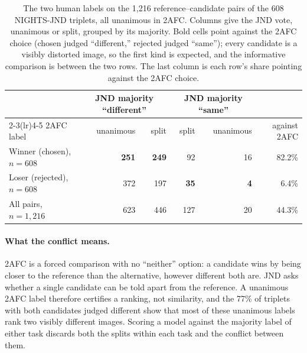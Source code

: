 \begin{table}[ht]
\caption{The two human labels on the 1{,}216 reference--candidate pairs of the 608 NIGHTS-JND triplets, all unanimous in 2AFC. Columns give the JND vote, unanimous or split, grouped by its majority. Bold cells point against the 2AFC choice (chosen judged ``different,'' rejected judged ``same''); every candidate is a visibly distorted image, so the first kind is expected, and the informative comparison is between the two rows. The last column is each row's share pointing against the 2AFC choice.}
\label{tab:disagree}
\centering
\small
\begin{tabular}{lrrrrr}
\toprule
 & \multicolumn{2}{c}{JND majority ``different''} & \multicolumn{2}{c}{JND majority ``same''} & \\
\cmidrule(lr){2-3}\cmidrule(lr){4-5}
2AFC label & unanimous & split & split & unanimous & against 2AFC \\
\midrule
Winner (chosen), $n=608$ & \textbf{251} & \textbf{249} & 92 & 16 & 82.2\% \\
Loser (rejected), $n=608$ & 372 & 197 & \textbf{35} & \textbf{4} & 6.4\% \\
\midrule
All pairs, $n=1{,}216$ & 623 & 446 & 127 & 20 & 44.3\% \\
\bottomrule
\end{tabular}
\end{table}

\paragraph{What the conflict means.} 2AFC is a forced comparison with no ``neither'' option: a candidate wins by being closer to the reference than the alternative, however different both are. JND asks whether a single candidate can be told apart from the reference. A unanimous 2AFC label therefore certifies a ranking, not similarity, and the 77\% of triplets with both candidates judged different show that most of these unanimous labels rank two visibly different images. Scoring a model against the majority label of either task discards both the splits within each task and the conflict between them.

\clearpage
